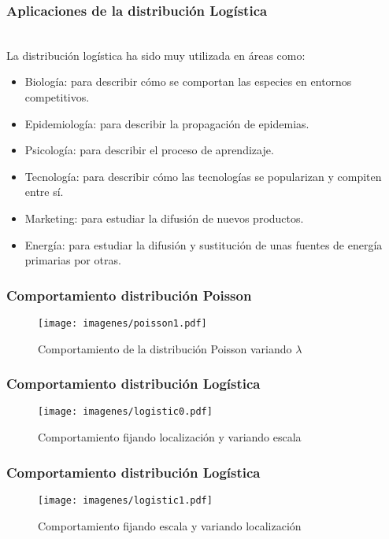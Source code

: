 \documentclass[11pt]{beamer}
\begin{document}
\begin{frame}
\frametitle{Aplicaciones de la distribución Logística}
~\\ La distribución logística ha sido muy utilizada en áreas como:
\begin{itemize}
\item Biología: para describir cómo se comportan las especies en entornos competitivos.
\item Epidemiología: para describir la propagación de epidemias.
\item Psicología: para describir el proceso de aprendizaje.
\item Tecnología: para describir cómo las tecnologías se popularizan y compiten entre sí.
\item Marketing: para estudiar la difusión de nuevos productos.
\item Energía: para estudiar la difusión y sustitución de unas fuentes de energía primarias por otras.
\end{itemize}
\end{frame}

\begin{frame}
\frametitle{Comportamiento distribución Poisson}
\begin{figure}[!h]
    \begin{center}
        \texttt{[image: imagenes/poisson1.pdf]}
        \caption{Comportamiento de la distribución Poisson variando $\lambda$}
        \label{fig:Densidad}
    \end{center}
\end{figure}
\end{frame}

\begin{frame}
\frametitle{Comportamiento distribución Logística}
\begin{figure}[!h]
    \begin{center}
        \texttt{[image: imagenes/logistic0.pdf]}
        \caption{Comportamiento fijando localización y variando escala}
        \label{fig:Densidad}
    \end{center}
\end{figure}
\end{frame}

\begin{frame}
\frametitle{Comportamiento distribución Logística}
\begin{figure}[!h]
    \begin{center}
        \texttt{[image: imagenes/logistic1.pdf]}
        \caption{Comportamiento fijando escala y variando localización}
        \label{fig:Densidad}
    \end{center}
\end{figure}
\end{frame}
\end{document}
